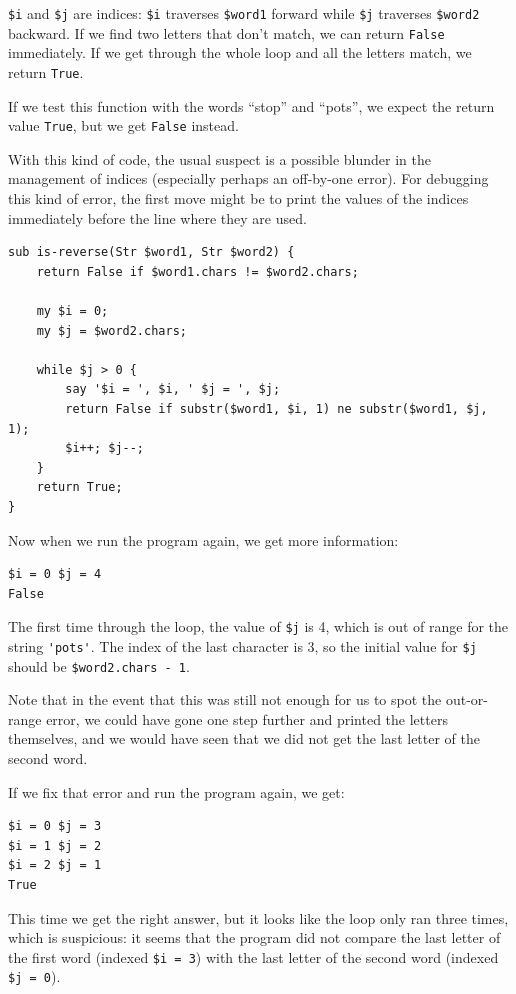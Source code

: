 {\tt \$i} and {\tt \$j} are indices: {\tt \$i} traverses 
{\tt \$word1} forward while {\tt \$j} traverses {\tt \$word2} 
backward.  If we find two letters that don't match, we 
can return {\tt False} immediately. If we get through the 
whole loop and all the letters match, we return {\tt True}.

If we test this function with the words ``stop'' and 
``pots'', we expect the return value {\tt True}, but we get 
{\tt False} instead. 

With this kind of code, the usual suspect is a possible 
blunder in the management of indices (especially perhaps 
an off-by-one error). For debugging this kind of error, 
the first move might be to print the values of the indices 
immediately before the line where they are used.

\begin{verbatim}
sub is-reverse(Str $word1, Str $word2) {
    return False if $word1.chars != $word2.chars;
    
    my $i = 0;
    my $j = $word2.chars;

    while $j > 0 {
        say '$i = ', $i, ' $j = ', $j;
        return False if substr($word1, $i, 1) ne substr($word1, $j, 1);
        $i++; $j--;
    }
    return True;
}
\end{verbatim}
%
Now when we run the program again, we get more information:

\begin{verbatim}
$i = 0 $j = 4
False
\end{verbatim}
%
The first time through the loop, the value of {\tt \$j} is 4,
which is out of range for the string \verb"'pots'".
The index of the last character is 3, so the
initial value for {\tt \$j} should be {\tt \$word2.chars - 1}.

Note that in the event that this was still not enough for us to 
spot the out-or-range error, we could have gone one step 
further and printed the letters themselves, and we would 
have seen that we did not get the last letter of the second 
word.

If we fix that error and run the program again, we get:

\begin{verbatim}
$i = 0 $j = 3
$i = 1 $j = 2
$i = 2 $j = 1
True
\end{verbatim}
%
This time we get the right answer, but it looks like the 
loop only ran three times, which is suspicious: it seems 
that the program did not compare the last letter of the 
first word (indexed {\tt \$i = 3}) with the last letter of 
the second word (indexed {\tt \$j = 0}).  

